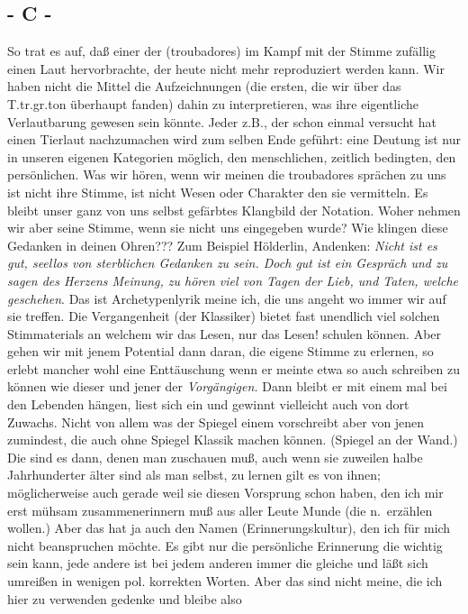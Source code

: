 \documentclass[
]{article}
\author{}
\date{\vspace{-2.5em}}
\begin{document}
\subsection{- C -}\label{c--}

So trat es auf, daß einer der (troubadores) im Kampf mit der Stimme
zufällig einen Laut hervorbrachte, der heute nicht mehr reproduziert
werden kann. Wir haben nicht die Mittel die Aufzeichnungen (die ersten,
die wir über das T.tr.gr.ton überhaupt fanden) dahin zu interpretieren,
was ihre eigentliche Verlautbarung gewesen sein könnte. Jeder z.B., der
schon einmal versucht hat einen Tierlaut nachzumachen wird zum selben
Ende geführt: eine Deutung ist nur in unseren eigenen Kategorien
möglich, den menschlichen, zeitlich bedingten, den persönlichen. Was wir
hören, wenn wir meinen die troubadores sprächen zu uns ist nicht ihre
Stimme, ist nicht Wesen oder Charakter den sie vermitteln. Es bleibt
unser ganz von uns selbst gefärbtes Klangbild der Notation. Woher nehmen
wir aber seine Stimme, wenn sie nicht uns eingegeben wurde? Wie klingen
diese Gedanken in deinen Ohren??? Zum Beispiel Hölderlin, Andenken:
\emph{Nicht ist es gut, seellos von sterblichen Gedanken zu sein. Doch
gut ist ein Gespräch und zu sagen des Herzens Meinung, zu hören viel von
Tagen der Lieb, und Taten, welche geschehen}. Das ist Archetypenlyrik
meine ich, die uns angeht wo immer wir auf sie treffen. Die
Vergangenheit (der Klassiker) bietet fast unendlich viel solchen
Stimmaterials an welchem wir das Lesen, nur das Lesen! schulen können.
Aber gehen wir mit jenem Potential dann daran, die eigene Stimme zu
erlernen, so erlebt mancher wohl eine Enttäuschung wenn er meinte etwa
so auch schreiben zu können wie dieser und jener der \emph{Vorgängigen.}
Dann bleibt er mit einem mal bei den Lebenden hängen, liest sich ein und
gewinnt vielleicht auch von dort Zuwachs. Nicht von allem was der
Spiegel einem vorschreibt aber von jenen zumindest, die auch ohne
Spiegel Klassik machen können. (Spiegel an der Wand.) Die sind es dann,
denen man zuschauen muß, auch wenn sie zuweilen halbe Jahrhunderter
älter sind als man selbst, zu lernen gilt es von ihnen; möglicherweise
auch gerade weil sie diesen Vorsprung schon haben, den ich mir erst
mühsam zusammenerinnern muß aus aller Leute Munde (die n.~erzählen
wollen.) Aber das hat ja auch den Namen (Erinnerungskultur), den ich für
mich nicht beanspruchen möchte. Es gibt nur die persönliche Erinnerung
die wichtig sein kann, jede andere ist bei jedem anderen immer die
gleiche und läßt sich umreißen in wenigen pol. korrekten Worten. Aber
das sind nicht meine, die ich hier zu verwenden gedenke und bleibe also
\end{document}
